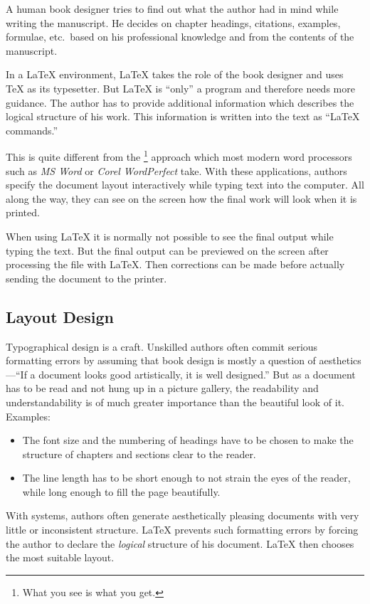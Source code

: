 A human book designer tries to find out what the author had in mind
while writing the manuscript. He decides on chapter headings,
citations, examples, formulae, etc.\ based on his professional
knowledge and from the contents of the manuscript.

In a \LaTeX{} environment, \LaTeX{} takes the role of the book
designer and uses \TeX{} as its typesetter. But \LaTeX{} is ``only'' a
program and therefore needs more guidance. The author has to provide
additional information which describes the logical structure of his
work. This information is written into the text as ``\LaTeX{}
commands.''

This is quite different from the \footnote{What you see is
  what you get.} approach which most modern word processors such as
\emph{MS Word} or \emph{Corel WordPerfect} take. With these
applications, authors specify the document layout interactively while
typing text into the computer. All along the way, they can see on the
screen how the final work will look when it is printed.

When using \LaTeX{} it is normally not possible to see the final output
while typing the text. But the final output can be previewed on the
screen after processing the file with \LaTeX. Then corrections can be
made before actually sending the document to the printer.

\subsection{Layout Design}

Typographical design is a craft. Unskilled authors often commit
serious formatting errors by assuming that book design is mostly a
question of aesthetics---``If a document looks good artistically,
it is well designed.'' But as a document has to be read and not hung
up in a picture gallery, the readability and understandability is of
much greater importance than the beautiful look of it.
Examples: 
\begin{itemize}
\item The font size and the numbering of headings have to be chosen to make
  the structure of chapters and sections clear to the reader.
\item The line length has to be short enough to not strain
  the eyes of the reader, while long enough to fill the page
  beautifully.
\end{itemize}

With  systems, authors often generate aesthetically
pleasing documents with very little or inconsistent structure.
\LaTeX{} prevents such formatting errors by forcing the author to
declare the \emph{logical} structure of his document. \LaTeX{} then
chooses the most suitable layout.

